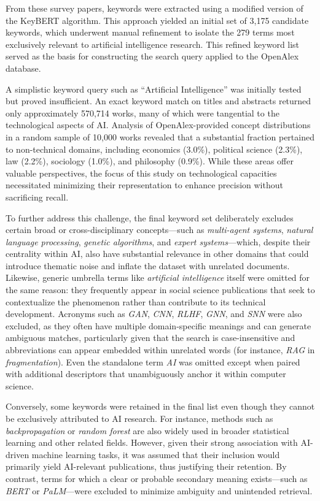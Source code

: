 \documentclass{article}
\begin{document}
From these survey papers, keywords were extracted using a modified version of the KeyBERT algorithm. This approach yielded an initial set of 3,175 candidate keywords, which underwent manual refinement to isolate the 279 terms most exclusively relevant to artificial intelligence research. This refined keyword list served as the basis for constructing the search query applied to the OpenAlex database.

A simplistic keyword query such as ``Artificial Intelligence'' was initially tested but proved insufficient. An exact keyword match on titles and abstracts returned only approximately 570{,}714 works, many of which were tangential to the technological aspects of AI. Analysis of OpenAlex-provided concept distributions in a random sample of 10{,}000 works revealed that a substantial fraction pertained to non-technical domains, including economics (3.0\%), political science (2.3\%), law (2.2\%), sociology (1.0\%), and philosophy (0.9\%). While these areas offer valuable perspectives, the focus of this study on technological capacities necessitated minimizing their representation to enhance precision without sacrificing recall.

To further address this challenge, the final keyword set deliberately excludes certain broad or cross-disciplinary concepts---such as \textit{multi-agent systems}, \textit{natural language processing}, \textit{genetic algorithms}, and \textit{expert systems}---which, despite their centrality within AI, also have substantial relevance in other domains that could introduce thematic noise and inflate the dataset with unrelated documents. Likewise, generic umbrella terms like \textit{artificial intelligence} itself were omitted for the same reason: they frequently appear in social science publications that seek to contextualize the phenomenon rather than contribute to its technical development. Acronyms such as \textit{GAN}, \textit{CNN}, \textit{RLHF}, \textit{GNN}, and \textit{SNN} were also excluded, as they often have multiple domain-specific meanings and can generate ambiguous matches, particularly given that the search is case-insensitive and abbreviations can appear embedded within unrelated words (for instance, \textit{RAG} in \textit{fragmentation}). Even the standalone term \textit{AI} was omitted except when paired with additional descriptors that unambiguously anchor it within computer science.

Conversely, some keywords were retained in the final list even though they cannot be exclusively attributed to AI research. For instance, methods such as \textit{backpropagation} or \textit{random forest} are also widely used in broader statistical learning and other related fields. However, given their strong association with AI-driven machine learning tasks, it was assumed that their inclusion would primarily yield AI-relevant publications, thus justifying their retention. By contrast, terms for which a clear or probable secondary meaning exists---such as \textit{BERT} or \textit{PaLM}---were excluded to minimize ambiguity and unintended retrieval.
\end{document}
